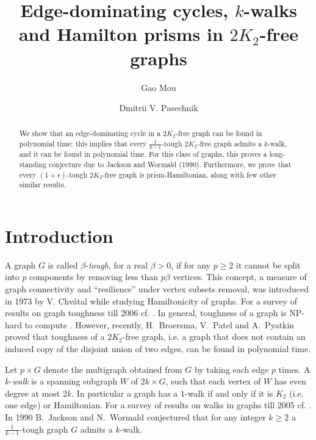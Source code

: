 \documentclass[runningheads,a4paper]{llncs}
\begin{document}
\mainmatter

\title{Edge-dominating cycles, $k$-walks and Hamilton prisms in $2K_2$-free graphs}

\author{Gao Mou \and Dmitrii V. Pasechnik}

\maketitle

\begin{abstract}
We show that an edge-dominating cycle in a $2K_2$-free graph can be found
in polynomial time; this implies that every $\frac{1}{k-1}$-tough
$2K_2$-free graph admits a $k$-walk, and it can be found in polynomial time.
For this class of graphs, this proves a
long-standing conjecture due to Jackson and Wormald (1990).
Furthermore, we prove that every $(1+\epsilon)$-tough $2K_2$-free graph is prism-Hamiltonian,
along with few other similar results.
\end{abstract}


\section{Introduction}
A graph $G$ is called $\beta$-{\em tough}, for a real $\beta>0$, if for any $p\geq 2$ it
cannot be split into $p$ components by removing less than $p\beta$ vertices.  
This concept, a measure of graph connectivity and ``resilience'' under vertex subsets removal,
was introduced in 1973 by V. Chv\'{a}tal 
while studying   Hamiltonicity of graphs. For a survey of results on graph toughness till 2006
cf. \cite{MR2221006}. In general, toughness of a graph is NP-hard to compute 
\cite{MR1074858}. However, recently, H.~Broersma, V.~Patel and A.~Pyatkin proved
\cite{broersma2014toughness} that toughness of a $2K_2$-free graph, i.e. a graph that
does not contain an induced copy of the disjoint union of two edges,
can be found in polynomial time.


Let $p\times G$ denote the multigraph obtained from $G$ by taking each edge $p$ times. 
A $k$-{\em walk} is a spanning subgraph $W$ of $2k\times G$, such that each vertex of $W$ 
has even degree at most $2k$. %
In particular a graph has a $1$-walk if and only if it is $K_2$ (i.e. one edge) or Hamiltonian.
{For a survey of results on walks in graphs till 2005 cf. \cite{kouider2005connected}.}
In 1990 B.~Jackson and N.~Wormald conjectured \cite{jackson1990k} that for any integer $k\ge2$ a
$\frac{1}{k-1}$-tough graph $G$ admits a $k$-walk.
\end{document}
